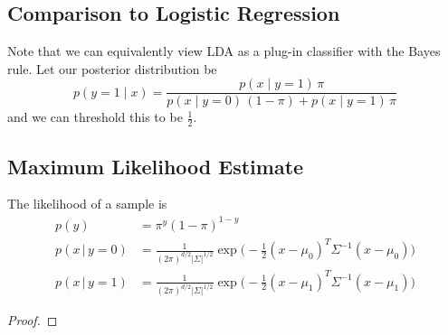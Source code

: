 \subsection{Comparison to Logistic Regression}

  Note that we can equivalently view LDA as a plug-in classifier with the Bayes rule. Let our posterior distribution be 
  \begin{equation}
    p(y = 1 \mid x) = \frac{p(x \mid y = 1) \, \pi}{p(x \mid y = 0) \, (1 - \pi) + p(x \mid y = 1) \, \pi}
  \end{equation}
  and we can threshold this to be $\frac{1}{2}$. 

\subsection{Maximum Likelihood Estimate} 

  \begin{lemma}[Likelihood]
    The likelihood of a sample is 
    \begin{align}
      p(y) & = \pi^y (1 - \pi)^{1-y} \\
      p(x\,|\,y = 0) & = \frac{1}{(2\pi)^{d/2} |\Sigma|^{1/2}} \exp \bigg(-\frac{1}{2} (x - \mu_0)^T \Sigma^{-1} (x - \mu_0)\bigg) \\
      p(x\,|\,y= 1) & = \frac{1}{(2\pi)^{d/2} |\Sigma|^{1/2}} \exp \bigg(-\frac{1}{2} (x - \mu_1)^T \Sigma^{-1} (x - \mu_1)\bigg)
    \end{align}
  \end{lemma}
  \begin{proof}
    
  \end{proof}

